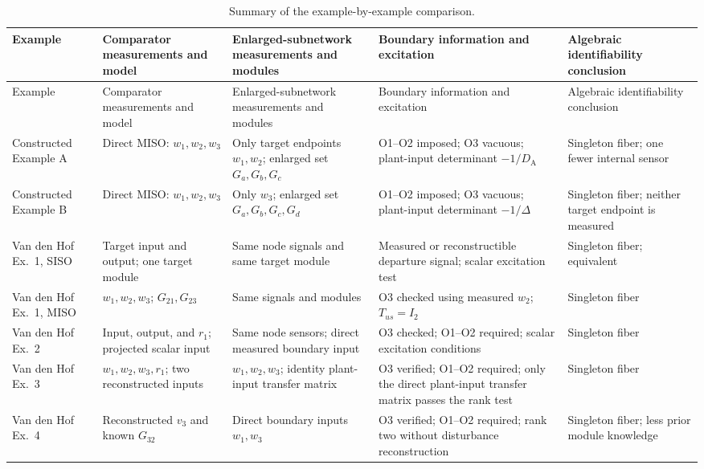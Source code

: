 \documentclass[11pt,a4paper]{article}
\begin{document}
\small
\begin{longtable}{@{}p{}p{}p{}p{}p{}@{}}
\caption{Summary of the example-by-example comparison.}
\label{tab:summary}\\
\toprule
Example & Comparator measurements and model & Enlarged-subnetwork measurements and modules & Boundary information and excitation & Algebraic identifiability conclusion \\
\midrule
\endfirsthead
\toprule
Example & Comparator measurements and model & Enlarged-subnetwork measurements and modules & Boundary information and excitation & Algebraic identifiability conclusion \\
\midrule
\endhead
\bottomrule
\endfoot
Constructed Example A
& Direct MISO: $w_1,w_2,w_3$
& Only target endpoints $w_1,w_2$; enlarged set $G_a,G_b,G_c$
& O1--O2 imposed; O3 vacuous; plant-input determinant $-1/D_{\mathrm A}$
& Singleton fiber; one fewer internal sensor \\
\addlinespace
Constructed Example B
& Direct MISO: $w_1,w_2,w_3$
& Only $w_3$; enlarged set $G_a,G_b,G_c,G_d$
& O1--O2 imposed; O3 vacuous; plant-input determinant $-1/\Delta$
& Singleton fiber; neither target endpoint is measured \\
\addlinespace
Van den Hof Ex.~1, SISO
& Target input and output; one target module
& Same node signals and same target module
& Measured or reconstructible departure signal; scalar excitation test
& Singleton fiber; equivalent \\
\addlinespace
Van den Hof Ex.~1, MISO
& $w_1,w_2,w_3$; $G_{21},G_{23}$
& Same signals and modules
& O3 checked using measured $w_2$; $T_{us}=I_2$
& Singleton fiber \\
\addlinespace
Van den Hof Ex.~2
& Input, output, and $r_1$; projected scalar input
& Same node sensors; direct measured boundary input
& O3 checked; O1--O2 required; scalar excitation conditions
& Singleton fiber \\
\addlinespace
Van den Hof Ex.~3
& $w_1,w_2,w_3,r_1$; two reconstructed inputs
& $w_1,w_2,w_3$; identity plant-input transfer matrix
& O3 verified; O1--O2 required; only the direct plant-input transfer matrix passes the rank test
& Singleton fiber \\
\addlinespace
Van den Hof Ex.~4
& Reconstructed $v_3$ and known $G_{32}$
& Direct boundary inputs $w_1,w_3$
& O3 verified; O1--O2 required; rank two without disturbance reconstruction
& Singleton fiber; less prior module knowledge \\

\end{longtable}
\end{document}
